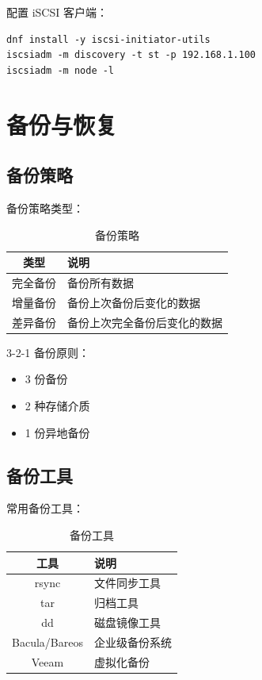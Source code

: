 \documentclass[12pt,UTF8]{ctexbook}
\begin{document}
配置 iSCSI 客户端：
\begin{verbatim}
dnf install -y iscsi-initiator-utils
iscsiadm -m discovery -t st -p 192.168.1.100
iscsiadm -m node -l
\end{verbatim}

\chapter{备份与恢复}
\label{chap:backup}

\section{备份策略}
\label{sec:backup_strategy}

备份策略类型：
\begin{table}[htbp]
    \centering
    \caption{备份策略}
    \begin{tabular}{|c|p{8cm}|}
        \hline
        \textbf{类型} & \textbf{说明} \\
        \hline
        完全备份 & 备份所有数据 \\
        \hline
        增量备份 & 备份上次备份后变化的数据 \\
        \hline
        差异备份 & 备份上次完全备份后变化的数据 \\
        \hline
    \end{tabular}
\end{table}

3-2-1 备份原则：
\begin{itemize}
    \item 3 份备份
    \item 2 种存储介质
    \item 1 份异地备份
\end{itemize}

\section{备份工具}
\label{sec:backup_tools}

常用备份工具：
\begin{table}[htbp]
    \centering
    \caption{备份工具}
    \begin{tabular}{|c|p{8cm}|}
        \hline
        \textbf{工具} & \textbf{说明} \\
        \hline
        rsync & 文件同步工具 \\
        \hline
        tar & 归档工具 \\
        \hline
        dd & 磁盘镜像工具 \\
        \hline
        Bacula/Bareos & 企业级备份系统 \\
        \hline
        Veeam & 虚拟化备份 \\
        \hline
    \end{tabular}
\end{table}
\end{document}
